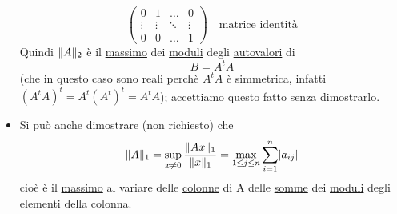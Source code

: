 \documentclass[12pt,a4paper]{article}
\DeclarePairedDelimiter{\abs}{\lvert}{\rvert}
\DeclarePairedDelimiter{\norma}{\lVert}{\rVert}
\begin{document}
\begin{itemize}
\[\begin{pmatrix}
        0 & 1 & \dotso & 0 \\
        \vdots & \vdots & \ddots & \vdots \\
        0 & 0 & \dotso & 1
    \end{pmatrix} \quad \text{matrice identità}\]
    Quindi $\norma{A}_2$ è il \underline{massimo} dei \underline{moduli} degli \underline{autovalori} di \[B = A^t A\]
    (che in questo caso sono reali perchè $A^t A$ è simmetrica,
    infatti $(A^t A)^t = A^t(A^t)^t = A^t A$); accettiamo questo fatto senza dimostrarlo. \\
    \item Si può anche dimostrare (non richiesto) che
    \[\norma{A}_1 = \sup_{x \ne 0} \frac{\norma{Ax}_1}{\norma{x}_1} = \max_{1 \le j \le n} \sum_{i=1}^n \abs{a_{ij}}\]
    cioè è il \underline{massimo} al variare delle \underline{colonne} di A delle \underline{somme} dei \underline{moduli} degli elementi della colonna.
\end{itemize}
\end{document}
